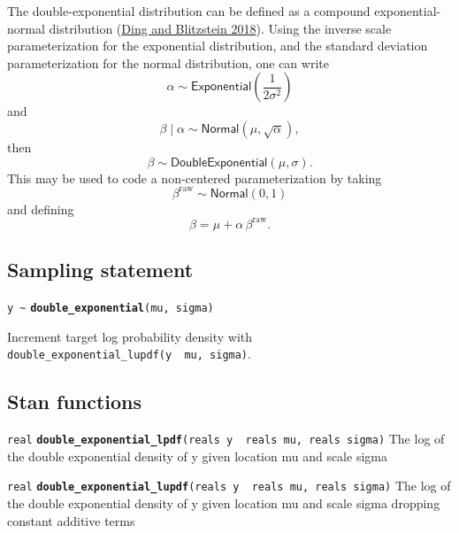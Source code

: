\documentclass[
  10pt,
]{book}
\begin{document}
The double-exponential distribution can be defined as a compound
exponential-normal distribution (\protect\hyperlink{ref-Ding:18}{Ding and Blitzstein 2018}). Using the inverse scale
parameterization for the exponential distribution, and the standard deviation
parameterization for the normal distribution, one can write \[ \alpha \sim
\mathsf{Exponential}\left( \frac{1}{2 \sigma^2} \right) \] and \[ \beta \mid
\alpha \sim \mathsf{Normal}(\mu, \sqrt{\alpha}), \] then \[ \beta \sim
\mathsf{DoubleExponential}(\mu, \sigma ). \] This may be used to code
a non-centered parameterization by taking \[ \beta^{\text{raw}} \sim
\mathsf{Normal}(0, 1) \] and defining \[ \beta = \mu + \alpha \,
\beta^{\text{raw}}. \]

\hypertarget{sampling-statement-29}{%
\subsection{Sampling statement}\label{sampling-statement-29}}

\texttt{y\ \textasciitilde{}} \textbf{\texttt{double\_exponential}}\texttt{(mu,\ sigma)}

Increment target log probability density with \texttt{double\_exponential\_lupdf(y\ \textbar{}\ mu,\ sigma)}.

\hypertarget{stan-functions-28}{%
\subsection{Stan functions}\label{stan-functions-28}}


\texttt{real} \textbf{\texttt{double\_exponential\_lpdf}}\texttt{(reals\ y\ \textbar{}\ reals\ mu,\ reals\ sigma)}\newline
The log of the double exponential density of y given location mu and
scale sigma


\texttt{real} \textbf{\texttt{double\_exponential\_lupdf}}\texttt{(reals\ y\ \textbar{}\ reals\ mu,\ reals\ sigma)}\newline
The log of the double exponential density of y given location mu and
scale sigma dropping constant additive terms
\end{document}
